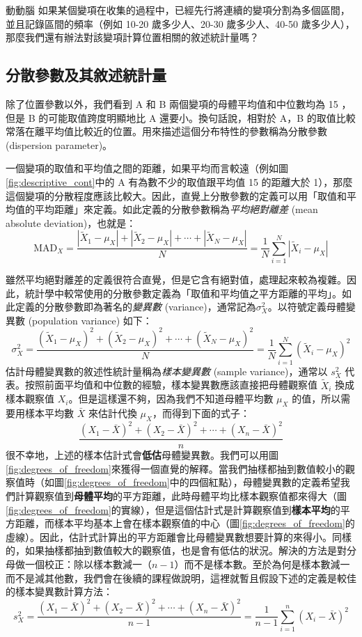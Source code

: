     \answerbox{160pt}
    
    \begin{custom}{動動腦}
        如果某個變項在收集的過程中，已經先行將連續的變項分割為多個區間，並且記錄區間的頻率（例如 10-20 歲多少人、20-30 歲多少人、40-50 歲多少人），那麼我們還有辦法對該變項計算位置相關的敘述統計量嗎？
    \end{custom}

    \answerbox{160pt}

\subsection{分散參數及其敘述統計量}
    除了位置參數以外，我們看到 A 和 B 兩個變項的母體平均值和中位數均為 15 ，但是 B 的可能取值跨度明顯地比 A 還要小。換句話說，相對於 A，B 的取值比較常落在離平均值比較近的位置。用來描述這個分布特性的參數稱為分散參數 (dispersion parameter)。
    
    一個變項的取值和平均值之間的距離，如果平均而言較遠（例如圖\ref{fig:descriptive_cont}中的 A 有為數不少的取值跟平均值 15 的距離大於 1），那麼這個變項的分散程度應該比較大。因此，直覺上分散參數的定義可以用「取值和平均值的平均距離」來定義。如此定義的分散參數稱為\textit{平均絕對離差} (mean absolute deviation)，也就是：
    \[\text{MAD}_X = \frac{|\tilde{X}_1-\mu_X|+|\tilde{X}_2-\mu_X|+\cdots+|\tilde{X}_N-\mu_X|}{N} = \frac{1}{N} \sum_{i=1}^N |\tilde{X}_i-\mu_X|\]

    雖然平均絕對離差的定義很符合直覺，但是它含有絕對值，處理起來較為複雜。因此，統計學中較常使用的分散參數定義為「取值和平均值之平方距離的平均」。如此定義的分散參數即為著名的\textit{變異數} (variance)，通常記為$\sigma^2_X$。以符號定義母體變異數 (population variance) 如下：
    \[\sigma^2_X = \frac{(\tilde{X}_1-\mu_X)^2+(\tilde{X}_2-\mu_X)^2+\cdots+(\tilde{X}_N-\mu_X)^2}{N} = \frac{1}{N} \sum_{i=1}^N (\tilde{X}_i-\mu_X)^2\]
    估計母體變異數的敘述性統計量稱為\textit{樣本變異數} (sample variance)，通常以 $s^2_X$ 代表。按照前面平均值和中位數的經驗，樣本變異數應該直接把母體觀察值 $\tilde{X}_i$ 換成樣本觀察值 $X_i$。但是這樣還不夠，因為我們不知道母體平均數 $\mu_X$ 的值，所以需要用樣本平均數 $\bar{X}$ 來估計代換 $\mu_X$，而得到下面的式子：
    \[\frac{(X_1-\bar{X})^2+(X_2-\bar{X})^2+\cdots+(X_n-\bar{X})^2}{n}\]
    很不幸地，上述的樣本估計式會\textbf{低估}母體變異數。我們可以用圖\ref{fig:degrees_of_freedom}來獲得一個直覺的解釋。當我們抽樣都抽到數值較小的觀察值時（如圖\ref{fig:degrees_of_freedom}中的四個紅點），母體變異數的定義希望我們計算觀察值到\textbf{母體平均}的平方距離，此時母體平均比樣本觀察值都來得大（圖\ref{fig:degrees_of_freedom}的實線），但是這個估計式是計算觀察值到\textbf{樣本平均}的平方距離，而樣本平均基本上會在樣本觀察值的中心（圖\ref{fig:degrees_of_freedom}的虛線）。因此，估計式計算出的平方距離會比母體變異數想要計算的來得小。同樣的，如果抽樣都抽到數值較大的觀察值，也是會有低估的狀況。解決的方法是對分母做一個校正：除以樣本數減一（$n-1$）而不是樣本數。至於為何是樣本數減一而不是減其他數，我們會在後續的課程做說明，這裡就暫且假設下述的定義是較佳的樣本變異數計算方法：
    \[s^2_X = \frac{(X_1-\bar{X})^2+(X_2-\bar{X})^2+\cdots+(X_n-\bar{X})^2}{n-1} = \frac{1}{n-1} \sum_{i=1}^n (X_i-\bar{X})^2\]

